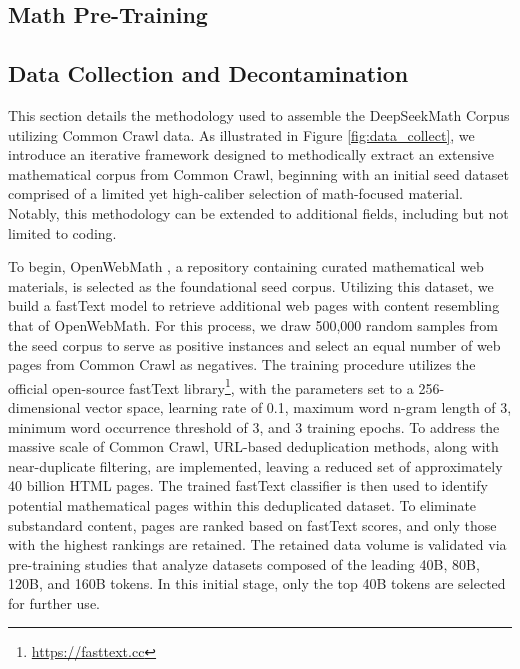 \begin{itemize}[topsep=0pt]
\section{Math Pre-Training}

\subsection{Data Collection and Decontamination} This section details the methodology used to assemble the DeepSeekMath Corpus utilizing Common Crawl data. As illustrated in Figure \ref{fig:data_collect}, we introduce an iterative framework designed to methodically extract an extensive mathematical corpus from Common Crawl, beginning with an initial seed dataset comprised of a limited yet high-caliber selection of math-focused material. Notably, this methodology can be extended to additional fields, including but not limited to coding.

To begin, OpenWebMath \citep{openwebmath}, a repository containing curated mathematical web materials, is selected as the foundational seed corpus. Utilizing this dataset, we build a fastText model \citep{joulin2016fasttext} to retrieve additional web pages with content resembling that of OpenWebMath. For this process, we draw 500,000 random samples from the seed corpus to serve as positive instances and select an equal number of web pages from Common Crawl as negatives. The training procedure utilizes the official open-source fastText library\footnote{\url{https://fasttext.cc}}, with the parameters set to a 256-dimensional vector space, learning rate of 0.1, maximum word n-gram length of 3, minimum word occurrence threshold of 3, and 3 training epochs. To address the massive scale of Common Crawl, URL-based deduplication methods, along with near-duplicate filtering, are implemented, leaving a reduced set of approximately 40 billion HTML pages. The trained fastText classifier is then used to identify potential mathematical pages within this deduplicated dataset. To eliminate substandard content, pages are ranked based on fastText scores, and only those with the highest rankings are retained. The retained data volume is validated via pre-training studies that analyze datasets composed of the leading 40B, 80B, 120B, and 160B tokens. In this initial stage, only the top 40B tokens are selected for further use.


\end{itemize}
